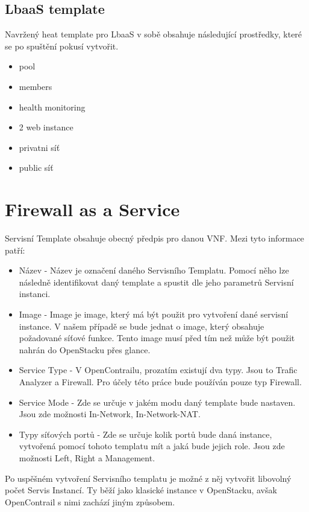 \subsection{LbaaS template}

Navržený heat template pro LbaaS v sobě obsahuje následující prostředky, které se po spuštění pokusí vytvořit.

\begin{itemize}
\item pool
\item members
\item health monitoring
\item 2 web instance
\item privatni síť
\item public síť
\end{itemize}



\section{Firewall as a Service}

Servisní Template obsahuje obecný předpis pro danou VNF. Mezi tyto informace patří:

\begin{itemize}
\item Název - Název je označení daného Servisního Templatu. Pomocí něho lze následně identifikovat daný template a spustit dle jeho parametrů Servisní instanci. 
\item Image - Image je image, který má být použit pro vytvoření dané servisní instance. V našem případě se bude jednat o image, který obsahuje požadované síťové funkce. Tento image musí před tím než může být použit  nahrán do OpenStacku přes glance.
\item Service Type - V OpenContrailu, prozatím existují dva typy. Jsou to Trafic Analyzer a Firewall. Pro účely této práce bude používán pouze typ Firewall.
\item Service Mode - Zde se určuje v jakém modu daný template bude nastaven. Jsou zde možnosti In-Network, In-Network-NAT.

\item Typy síťových portů - Zde se určuje kolik portů bude daná instance, vytvořená pomocí tohoto templatu mít a jaká bude jejich role. Jsou zde možnosti Left, Right a Management. 

\end{itemize}

Po uspěšném vytvoření Servisního templatu je možné z něj vytvořit libovolný počet Servis Instancí. Ty běží jako klasické instance v OpenStacku, avšak OpenContrail s nimi zachází jiným způsobem. 

